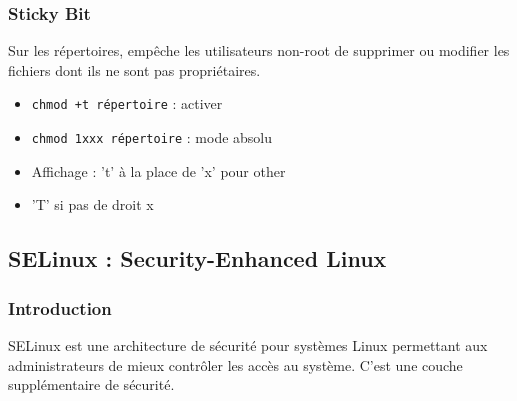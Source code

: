 \documentclass[12pt,a4paper]{article}
\begin{document}
\subsubsection{Sticky Bit}
Sur les r\'epertoires, emp\^eche les utilisateurs non-root de supprimer ou modifier les fichiers dont ils ne sont pas propri\'etaires.
\begin{itemize}
    \item \texttt{chmod +t r\'epertoire} : activer %
    \item \texttt{chmod 1xxx r\'epertoire} : mode absolu %
    \item Affichage : 't' \`a la place de 'x' pour other %
    \item 'T' si pas de droit x %
\end{itemize}


\subsection{SELinux : Security-Enhanced Linux}


\subsubsection{Introduction}
SELinux est une architecture de s\'ecurit\'e pour syst\`emes Linux permettant aux administrateurs de mieux contr\^oler les acc\`es au syst\`eme. C'est une couche suppl\'ementaire de s\'ecurit\'e.
\end{document}
